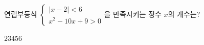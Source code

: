 \hspace*{2mm}\begin{minipage}[t]{\dimexpr\linewidth-2mm\relax}\vspace{0pt}
연립부등식 $\begin{cases} |x-2|<6 \\ x^2-10x+9>0 \end{cases}$을 만족시키는 정수 $x$의 개수는?
\begin{choices32}{$2$}{$3$}{$4$}{$5$}{$6$}\end{choices32}\end{minipage}
